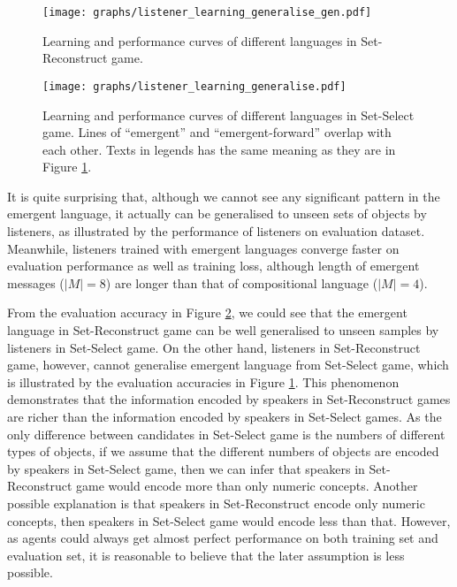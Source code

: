 \begin{figure}[!h]
    \centering
    \texttt{[image: graphs/listener\_learning\_generalise\_gen.pdf]}
    \caption{Learning and performance curves of different languages in Set-Reconstruct game.}
    \label{fig4.0:listener_learning_generalise_gen}
\end{figure}

\begin{figure}[!h]
    \centering
    \texttt{[image: graphs/listener\_learning\_generalise.pdf]}
    \caption{Learning and performance curves of different languages in Set-Select game. Lines of ``emergent'' and ``emergent-forward'' overlap with each other. Texts in legends has the same meaning as they are in Figure \ref{fig4.0:listener_learning_generalise_gen}.}
    \label{fig4.00:listener_learning_generalise_ref}
\end{figure}

It is quite surprising that, although we cannot see any significant pattern in the emergent language, it actually can be generalised to unseen sets of objects by listeners, as illustrated by the performance of listeners on evaluation dataset. Meanwhile, listeners trained with emergent languages converge faster on evaluation performance as well as training loss, although length of emergent messages ($|M|=8$) are longer than that of compositional language ($|M|=4$).

From the evaluation accuracy in Figure \ref{fig4.00:listener_learning_generalise_ref}, we could see that the emergent language in Set-Reconstruct game can be well generalised to unseen samples by listeners in Set-Select game. On the other hand, listeners in Set-Reconstruct game, however, cannot generalise emergent language from Set-Select game, which is illustrated by the evaluation accuracies in Figure \ref{fig4.0:listener_learning_generalise_gen}. This phenomenon demonstrates that the information encoded by speakers in Set-Reconstruct games are richer than the information encoded by speakers in Set-Select games. As the only difference between candidates in Set-Select game is the numbers of different types of objects, if we assume that the different numbers of objects are encoded by speakers in Set-Select game, then we can infer that speakers in Set-Reconstruct game would encode more than only numeric concepts. Another possible explanation is that speakers in Set-Reconstruct encode only numeric concepts, then speakers in Set-Select game would encode less than that. However, as agents could always get almost perfect performance on both training set and evaluation set, it is reasonable to believe that the later assumption is less possible.

